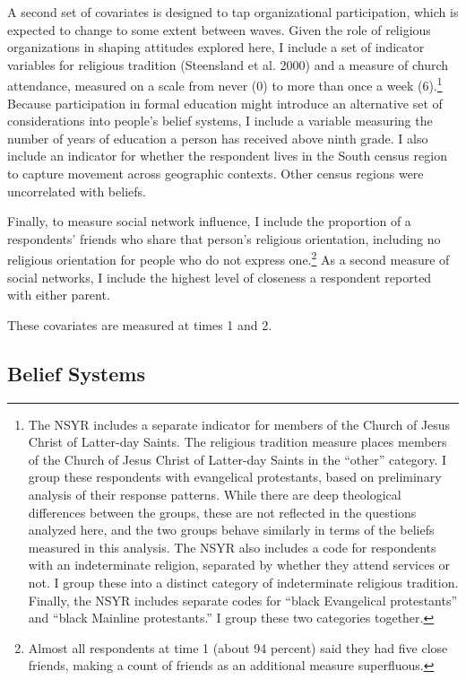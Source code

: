 \documentclass[12pt,]{article}
\begin{document}
A second set of covariates is designed to tap organizational participation, which is expected to change to some extent between waves. Given the role of religious organizations in shaping attitudes explored here, I include a set of indicator variables for religious tradition (Steensland et al. 2000) and a measure of church attendance, measured on a scale from never (0) to more than once a week (6).\footnote{The NSYR includes a separate indicator for members of the Church of Jesus Christ of Latter-day Saints. The religious tradition measure places members of the Church of Jesus Christ of Latter-day Saints in the ``other'' category. I group these respondents with evangelical protestants, based on preliminary analysis of their response patterns. While there are deep theological differences between the groups, these are not reflected in the questions analyzed here, and the two groups behave similarly in terms of the beliefs measured in this analysis. The NSYR also includes a code for respondents with an indeterminate religion, separated by whether they attend services or not. I group these into a distinct category of indeterminate religious tradition. Finally, the NSYR includes separate codes for ``black Evangelical protestants'' and ``black Mainline protestants.'' I group these two categories together.} Because participation in formal education might introduce an alternative set of considerations into people's belief systems, I include a variable measuring the number of years of education a person has received above ninth grade. I also include an indicator for whether the respondent lives in the South census region to capture movement across geographic contexts. Other census regions were uncorrelated with beliefs.

Finally, to measure social network influence, I include the proportion of a respondents' friends who share that person's religious orientation, including no religious orientation for people who do not express one.\footnote{Almost all respondents at time 1 (about 94 percent) said they had five close friends, making a count of friends as an additional measure superfluous.} As a second measure of social networks, I include the highest level of closeness a respondent reported with either parent.

These covariates are measured at times 1 and 2.

\hypertarget{belief-systems}{%
\subsection{Belief Systems}\label{belief-systems}}
\end{document}
